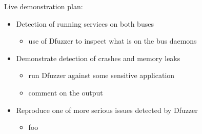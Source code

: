\documentclass[conference]{IEEEtran}
\begin{document}
\appendix
Live demonstration plan:
\begin{itemize}
	\item Detection of running services on both buses
		\begin{itemize}
			\item use of Dfuzzer to inspect what is on the bus daemons
		\end{itemize}
	\item Demonstrate detection of crashes and memory leaks
		\begin{itemize}
			\item run Dfuzzer against some sensitive application
			\item comment on the output
		\end{itemize}
	\item Reproduce one of more serious issues detected by Dfuzzer
		\begin{itemize}
			\item foo
		\end{itemize}
\end{itemize}



\end{document}
